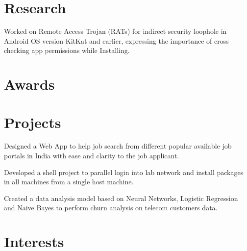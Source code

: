 \documentclass[]{deedy-resume-openfont}
\begin{document}
\begin{minipage}[t]{0.66\textwidth}

\section{Research}
\descript{}
\begin{tightemize}
\item Worked on Remote Access Trojan (RATs) for indirect security loophole in Android OS version KitKat and earlier, expressing the importance of cross checking app permissions while Installing.
\end{tightemize}


\section{Awards} 
\sectionsep


\section{Projects} 
Designed a Web App to help job search from different popular available job portals in India with ease and clarity to the job applicant. 

\vspace{\topsep} %

Developed a shell project to parallel login into lab network and install packages in all machines from a single host machine.

\vspace{\topsep} %
Created a data analysis model based on Neural Networks, Logistic Regression and Naive Bayes to perform churn analysis on telecom customers data.

\vspace{2pt}

\section{Interests} 

\end{minipage} 
\end{document}
